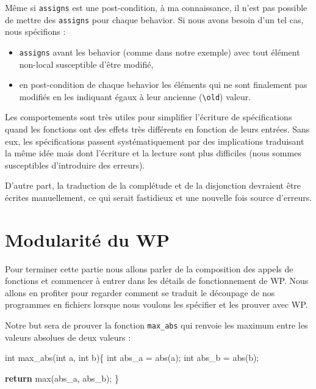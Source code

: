 \documentclass[12pt,francais,]{scrbook}
\newenvironment{Shaded}{}{}
\newcommand{\KeywordTok}[1]{\textcolor[rgb]{0.00,0.44,0.13}{\textbf{{#1}}}}
\newcommand{\DataTypeTok}[1]{\textcolor[rgb]{0.56,0.13,0.00}{{#1}}}
\newcommand{\NormalTok}[1]{{#1}}
\newenvironment{zdsalertblock}[1]{%
  \tcolorbox[beamer,%
    noparskip,breakable,
    colback=LightCoral,colframe=DarkRed,%
    colbacklower=Tomato,%
    title=#1]
}{\endtcolorbox}
\begin{document}
\begin{zdsalertblock}{Attention}
  Même si \texttt{assigns} est une
  post-condition, à ma connaissance, il n'est pas possible de
  mettre des \texttt{assigns} pour chaque behavior. Si nous avons
  besoin d'un tel cas, nous spécifions :
  \begin{itemize}
  \item \texttt{assigns} avant les behavior (comme dans notre exemple) avec
    tout élément non-local susceptible d'être modifié,
  \item en post-condition de chaque behavior les éléments qui ne sont
    finalement pas modifiés en les indiquant égaux à leur
    ancienne (\texttt{\textbackslash{}old}) valeur.
  \end{itemize}
\end{zdsalertblock}

Les comportements sont très utiles pour simplifier l'écriture de
spécifications quand les fonctions ont des effets très différents en
fonction de leurs entrées. Sans eux, les spécifications passent
systématiquement par des implications traduisant la même idée mais dont
l'écriture et la lecture sont plus difficiles (nous sommes susceptibles
d'introduire des erreurs).

D'autre part, la traduction de la complétude et de la disjonction
devraient être écrites manuellement, ce qui serait fastidieux et une
nouvelle fois source d'erreurs.

\section{Modularité du WP}\label{modularituxe9-du-wp}

Pour terminer cette partie nous allons parler de la composition des
appels de fonctions et commencer à entrer dans les détails de
fonctionnement de WP. Nous allons en profiter pour regarder comment se
traduit le découpage de nos programmes en fichiers lorsque nous voulons
les spécifier et les prouver avec WP.

Notre but sera de prouver la fonction \texttt{max\_abs} qui renvoie les
maximum entre les valeurs absolues de deux valeurs :

\begin{footnotesize}\begin{Shaded}
\begin{Highlighting}[]
\DataTypeTok{int} \NormalTok{max_abs(}\DataTypeTok{int} \NormalTok{a, }\DataTypeTok{int} \NormalTok{b)\{}
  \DataTypeTok{int} \NormalTok{abs_a = abs(a);}
  \DataTypeTok{int} \NormalTok{abs_b = abs(b);}

  \KeywordTok{return} \NormalTok{max(abs_a, abs_b);}
\NormalTok{\}}
\end{Highlighting}
\end{Shaded}\end{footnotesize}
\end{document}
